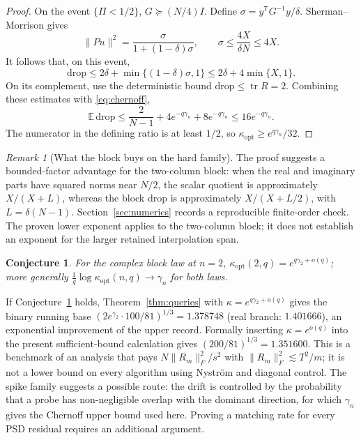\documentclass[11pt,a4paper]{article}
\newtheorem{conjecture}[theorem]{Conjecture}
\theoremstyle{definition}\newtheorem{definition}[theorem]{Definition}
\theoremstyle{remark}\newtheorem{remark}[theorem]{Remark}
\numberwithin{equation}{section}
\newcommand{\E}{\mathbb E}
\newcommand{\tr}{\operatorname{tr}}
\newcommand{\norm}[1]{\lVert#1\rVert}
\newcommand{\opt}{\mathrm{opt}}
\begin{document}
\begin{proof}
On the event \(\{\Pi<1/2\}\), \(G\succeq(N/4)I\).
Define \(\sigma=y^{\mathsf T}G^{-1}y/\delta\).
Sherman--Morrison gives
\[
 \|Pu\|^2=\frac{\sigma}{1+(1-\delta)\sigma},
 \qquad
 \sigma\le\frac{4X}{\delta N}\le4X.
\]
It follows that, on this event,
\[
 \mathrm{drop}
 \le2\delta+\min\{(1-\delta)\sigma,1\}
 \le2\delta+4\min\{X,1\}.
\]
On its complement, use the deterministic bound
\(\mathrm{drop}\le\tr R=2\).
Combining these estimates with \eqref{eq:chernoff},
\[
 \E\,\mathrm{drop}
 \le\frac2{N-1}+4e^{-q\gamma_n}+8e^{-q\gamma_n}
 \le16e^{-q\gamma_n}.
\]
The numerator in the defining ratio is at least \(1/2\), so
\(\kappa_\opt\ge e^{q\gamma_n}/32\).
\end{proof}

\begin{remark}[What the block buys on the hard family]
The proof suggests a bounded-factor advantage for the two-column block:
when the real and imaginary parts have squared norms near \(N/2\),
the scalar quotient is approximately \(X/(X+L)\), whereas the block
drop is approximately \(X/(X+L/2)\), with \(L=\delta(N-1)\).
Section~\ref{sec:numerics} records a reproducible finite-order check.
The proven lower exponent applies to the two-column block; it does not
establish an exponent for the larger retained interpolation span.
\end{remark}

\begin{conjecture}\label{conj:gamma}
For the complex block law at $n=2$,
$\kappa_\opt(2,q)=e^{q\gamma_2+o(q)}$; more generally
$\frac1q\log\kappa_\opt(n,q)\to\gamma_n$ for both laws.
\end{conjecture}

If Conjecture~\ref{conj:gamma} holds, Theorem~\ref{thm:queries} with
$\kappa=e^{q\gamma_2+o(q)}$ gives the binary running base
$(2e^{\gamma_2}\cdot100/81)^{1/3}=1.378748$ (real branch: $1.401666$), an
exponential improvement of the upper record. Formally inserting $\kappa=e^{o(q)}$ into the present sufficient-bound
calculation gives $(200/81)^{1/3}=1.351600$. This is a benchmark of an analysis
that pays $N\norm{R_m}_F^2/s^2$ with
$\norm{R_m}_F^2\lesssim T^2/m$; it is not a lower bound on every algorithm
using Nystr\"om and diagonal control. The spike family suggests a possible route: the drift is controlled by the probability that a probe has
non-negligible overlap with the dominant direction, for which $\gamma_n$ gives the Chernoff upper bound used here.
Proving a matching rate for every PSD residual requires an additional argument.
\end{document}
